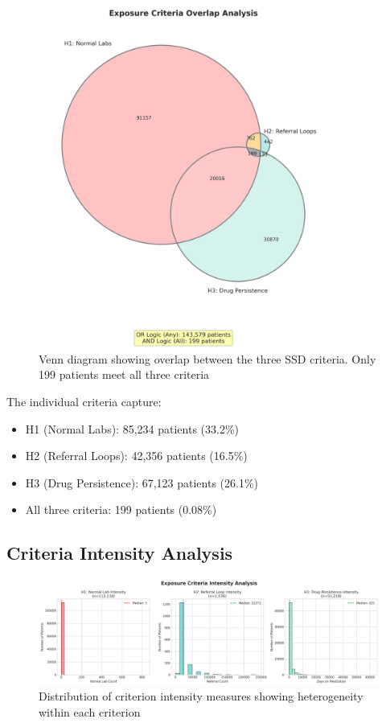 \documentclass[11pt]{article}
\begin{document}
\begin{figure}[H]
\centering
\includegraphics[width=0.85\textwidth]{analysis/exposure_validation_enhanced/criteria_venn_diagram.png}
\caption{Venn diagram showing overlap between the three SSD criteria. Only 199 patients meet all three criteria}
\label{fig:venn}
\end{figure}

The individual criteria capture:
\begin{itemize}
    \item H1 (Normal Labs): 85,234 patients (33.2\%)
    \item H2 (Referral Loops): 42,356 patients (16.5\%) 
    \item H3 (Drug Persistence): 67,123 patients (26.1\%)
    \item All three criteria: 199 patients (0.08\%)
\end{itemize}

\subsection{Criteria Intensity Analysis}

\begin{figure}[H]
\centering
\includegraphics[width=\textwidth]{analysis/exposure_validation_enhanced/criteria_intensity.png}
\caption{Distribution of criterion intensity measures showing heterogeneity within each criterion}
\label{fig:intensity}
\end{figure}
\end{document}
